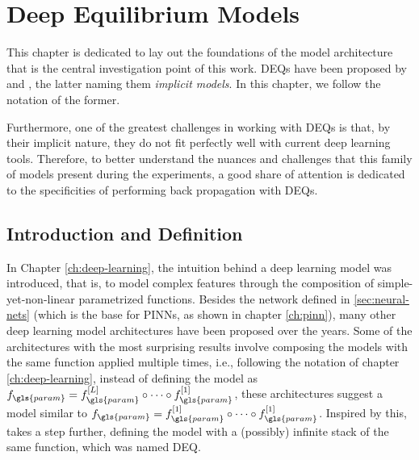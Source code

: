 \chapter{Deep Equilibrium Models}\label{ch:deq}

This chapter is dedicated to lay out the foundations of the model architecture that is the central investigation point of this work.
\gls{DEQ}s have been proposed by \textcite{Bai2019} and \textcite{Ghaoui2019}, the latter naming them \emph{implicit models}.
In this chapter, we follow the notation of the former.

Furthermore, one of the greatest challenges in working with \gls{DEQ}s is that, by their implicit nature, they do not fit perfectly well with current deep learning tools.
Therefore, to better understand the nuances and challenges that this family of models present during the experiments, a good share of attention is dedicated to the specificities of performing back propagation with \gls{DEQ}s.

\section{Introduction and Definition}

In Chapter \ref{ch:deep-learning}, the intuition behind a deep learning model was introduced, that is, to model complex features through the composition of simple-yet-non-linear parametrized functions.
Besides the network defined in \ref{sec:neural-nets} (which is the base for \gls{PINN}s, as shown in chapter \ref{ch:pinn}), many other deep learning model architectures have been proposed over the years.
    Some of the architectures with the most surprising results involve composing the models with the same function applied multiple times, i.e., following the notation of chapter \ref{ch:deep-learning}, instead of defining the model as $f_{\gls{param}}=f_{\gls{param}}^{[L]}\circ \cdots \circ f_{\gls{param}}^{[1]}$, these architectures suggest a model similar to $f_{\gls{param}}=f_{\gls{param}}^{[1]}\circ \cdots \circ f_{\gls{param}}^{[1]}$.
Inspired by this, \textcite{Bai2019} takes a step further, defining the model with a (possibly) infinite stack of the same function, which was named \gls{DEQ}.

